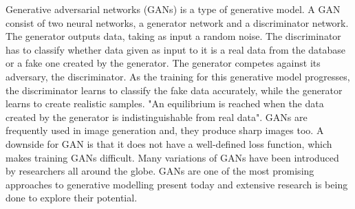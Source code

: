 Generative adversarial networks (GANs) is a type of generative model. A GAN consist of two neural networks, a generator network and a discriminator network. The generator outputs data, taking as input a random noise. The discriminator has to classify whether data given as input to it is a real data from the database or a fake one created by the generator. The generator competes against its adversary, the discriminator. As the training for this generative model progresses, the discriminator learns to classify the fake data accurately, while the generator learns to create realistic samples. "An equilibrium is reached when the data created by the generator is indistinguishable from real data". GANs are frequently used in image generation and, they produce sharp images too. A downside for GAN is that it does not have a well-defined loss function, which makes training GANs difficult. Many variations of GANs have been introduced by researchers all around the globe. GANs are one of the most promising approaches to generative modelling present today and extensive research is being done to explore their potential.